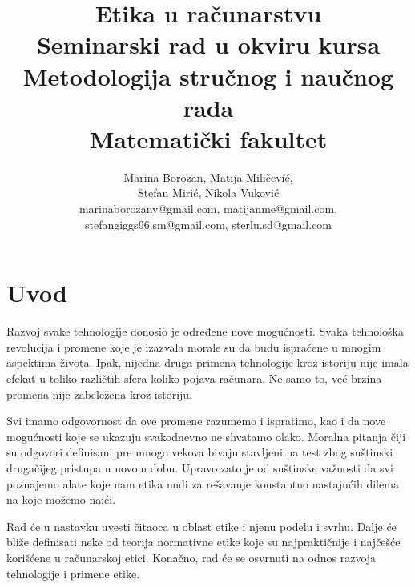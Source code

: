 \documentclass[a4paper]{article}
\begin{document}
\title{Etika u računarstvu\\ \small{Seminarski rad u okviru kursa\\Metodologija stručnog i naučnog rada\\ Matematički fakultet}}

\author{
	Marina Borozan, Matija Miličević,\\
	Stefan Mirić, Nikola Vuković\\
	marinaborozanv@gmail.com, matijanme@gmail.com,\\
	stefangiggs96.sm@gmail.com, sterlu.sd@gmail.com
}


\maketitle


\tableofcontents

\newpage

\section{Uvod}

Razvoj svake tehnologije donosio je određene nove mogućnosti. Svaka tehnološka revolucija i promene koje je izazvala morale su da budu ispraćene u mnogim aspektima života. Ipak, nijedna druga primena tehnologije kroz istoriju nije imala efekat u toliko različtih sfera koliko pojava računara. Ne samo to, već brzina promena nije zabeležena kroz istoriju. 

Svi imamo odgovornost da ove promene razumemo i ispratimo, kao i da nove mogućnosti koje se ukazuju svakodnevno ne shvatamo olako. Moralna pitanja čiji su odgovori definisani pre mnogo vekova bivaju stavljeni na test zbog suštinski drugačijeg pristupa u novom dobu. Upravo zato je od suštinske važnosti da svi poznajemo alate koje nam etika nudi za rešavanje konstantno nastajućih dilema na koje možemo naići. 

Rad će u nastavku uvesti čitaoca u oblast etike i njenu podelu i svrhu. Dalje će bliže definisati neke od teorija normativne etike koje su najpraktičnije i najčešće korišćene u računarskoj etici. Konačno, rad će se osvrnuti na odnos razvoja tehnologije i primene etike. 
\end{document}
